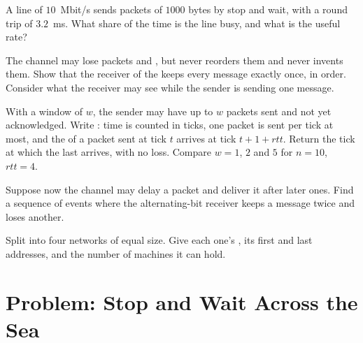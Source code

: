 \begin{exercise}[$\star\star$]\label{exo:g11:network-protocols:11}
A line of $10$~Mbit/s sends packets of $1000$ bytes by stop and wait, with a round trip of $3.2$~ms. What share of the
time is the line busy, and what is the useful rate?
\end{exercise}

\begin{exercise}[$\star\star\star$]\label{exo:g11:network-protocols:12}
The channel may lose packets and , but never reorders them and never invents them. Show that the
receiver of the  keeps every message exactly once, in order. Consider what the receiver may see
while the sender is sending one message.
\end{exercise}

\begin{exercise}[$\star\star\star$]\label{exo:g11:network-protocols:13}
With a window of $w$, the sender may have up to $w$ packets sent and not yet acknowledged. Write
: time is counted in ticks, one packet is sent per tick at most, and the 
of a packet sent at tick $t$ arrives at tick $t + 1 + \mathit{rtt}$. Return the tick at which the last 
arrives, with no loss. Compare $w = 1$, $2$ and $5$ for $n = 10$, $\mathit{rtt} = 4$.
\end{exercise}

\begin{exercise}[$\star\star\star$]\label{exo:g11:network-protocols:14}
Suppose now the channel may delay a packet and deliver it after later ones. Find a sequence of events where the
alternating-bit receiver keeps a message twice and loses another.
\end{exercise}

\begin{exercise}[$\star\star\star$]\label{exo:g11:network-protocols:15}
Split  into four networks of equal size. Give each one's , its first and last addresses, and
the number of machines it can hold.
\end{exercise}

\section{Problem: Stop and Wait Across the Sea}\label{sec:g11:network-protocols:problem}

